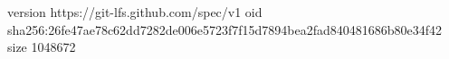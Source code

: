 version https://git-lfs.github.com/spec/v1
oid sha256:26fe47ae78c62dd7282de006e5723f7f15d7894bea2fad840481686b80e34f42
size 1048672
